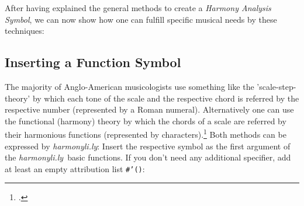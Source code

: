 \documentclass[
  DIV=calc,
  BCOR=5mm,
  12pt,
  headings=small,
  oneside,
  abstract=true,
  toc=bib,
  xcolor=dvipsnames,
  openany,
  english]{scrartcl}
\newcommand{\hlyn}[0]{\textit{harmonyli.ly}}
\newcommand{\has}[1]{\textit{Harmony Analysis Symbol#1}}
\begin{document}
After having explained the general methods to create a \has{}, we can now show
how one can fulfill specific musical needs by these techniques:

\subsection{Inserting a Function Symbol}

The majority of Anglo-American musicologists use something like the
'scale-step-theory' by which each tone of the scale and the respective chord is
referred by the respective number (represented by a Roman numeral).
Alternatively one can use the functional (harmony) theory by which the chords of
a scale are referred by their harmonious functions (represented by
characters).\footcite[for dedails cf.][\nopage wp]{wpFunctionTheory2019a} Both
methods can be expressed by \hlyn: Insert the respective symbol as the first
argument of the \hlyn\ basic functions. If you don't need any additional
specifier, add at least an empty attribution list \texttt{\#'()}:
\end{document}
